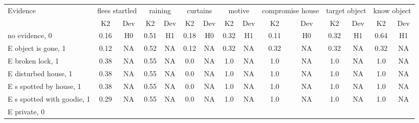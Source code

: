 \begin{table}\begin{tabular}{l|cc|cc|cc|cc|cc|cc|cc}\toprule\multirow{2}{*}{Evidence} & \multicolumn{2}{c}{flees startled}& \multicolumn{2}{c}{raining}& \multicolumn{2}{c}{curtains}& \multicolumn{2}{c}{motive}& \multicolumn{2}{c}{compromise house}& \multicolumn{2}{c}{target object}& \multicolumn{2}{c}{know object}\\& {K2} & {Dev}& {K2} & {Dev}& {K2} & {Dev}& {K2} & {Dev}& {K2} & {Dev}& {K2} & {Dev}& {K2} & {Dev}\\\midrule
no evidence, 0 & \cellcolor{Bittersweet}0.16&\cellcolor{Bittersweet}H0&\cellcolor{Bittersweet}0.51&\cellcolor{Bittersweet}H1&\cellcolor{Bittersweet}0.18&\cellcolor{Bittersweet}H0&\cellcolor{Bittersweet}0.32&\cellcolor{Bittersweet}H1&\cellcolor{Bittersweet}0.11&\cellcolor{Bittersweet}H0&\cellcolor{Bittersweet}0.32&\cellcolor{Bittersweet}H1&\cellcolor{Bittersweet}0.64&\cellcolor{Bittersweet}H1\\E object is gone, 1 & \cellcolor{Bittersweet}0.12&\cellcolor{Bittersweet}NA&\cellcolor{Bittersweet}0.52&\cellcolor{Bittersweet}NA&\cellcolor{Bittersweet}0.12&\cellcolor{Bittersweet}NA&\cellcolor{Bittersweet}0.32&\cellcolor{Bittersweet}NA&\cellcolor{Bittersweet}0.32&\cellcolor{Bittersweet}NA&\cellcolor{Bittersweet}0.32&\cellcolor{Bittersweet}NA&\cellcolor{Bittersweet}0.32&\cellcolor{Bittersweet}NA\\E broken lock, 1 & \cellcolor{Bittersweet}0.38&\cellcolor{Bittersweet}NA&\cellcolor{Bittersweet}0.55&\cellcolor{Bittersweet}NA&\cellcolor{Bittersweet}0.0&\cellcolor{Bittersweet}NA&\cellcolor{Bittersweet}1.0&\cellcolor{Bittersweet}NA&\cellcolor{Bittersweet}1.0&\cellcolor{Bittersweet}NA&\cellcolor{Bittersweet}1.0&\cellcolor{Bittersweet}NA&\cellcolor{Bittersweet}1.0&\cellcolor{Bittersweet}NA\\E disturbed house, 1 & \cellcolor{Bittersweet}0.38&\cellcolor{Bittersweet}NA&\cellcolor{Bittersweet}0.55&\cellcolor{Bittersweet}NA&\cellcolor{Bittersweet}0.0&\cellcolor{Bittersweet}NA&\cellcolor{Bittersweet}1.0&\cellcolor{Bittersweet}NA&\cellcolor{Bittersweet}1.0&\cellcolor{Bittersweet}NA&\cellcolor{Bittersweet}1.0&\cellcolor{Bittersweet}NA&\cellcolor{Bittersweet}1.0&\cellcolor{Bittersweet}NA\\E s spotted by house, 1 & \cellcolor{Bittersweet}0.38&\cellcolor{Bittersweet}NA&\cellcolor{Bittersweet}0.55&\cellcolor{Bittersweet}NA&\cellcolor{Bittersweet}0.0&\cellcolor{Bittersweet}NA&\cellcolor{Bittersweet}1.0&\cellcolor{Bittersweet}NA&\cellcolor{Bittersweet}1.0&\cellcolor{Bittersweet}NA&\cellcolor{Bittersweet}1.0&\cellcolor{Bittersweet}NA&\cellcolor{Bittersweet}1.0&\cellcolor{Bittersweet}NA\\E s spotted with goodie, 1 & \cellcolor{Bittersweet}0.29&\cellcolor{Bittersweet}NA&\cellcolor{Bittersweet}0.55&\cellcolor{Bittersweet}NA&\cellcolor{Bittersweet}0.0&\cellcolor{Bittersweet}NA&\cellcolor{Bittersweet}1.0&\cellcolor{Bittersweet}NA&\cellcolor{Bittersweet}1.0&\cellcolor{Bittersweet}NA&\cellcolor{Bittersweet}1.0&\cellcolor{Bittersweet}NA&\cellcolor{Bittersweet}1.0&\cellcolor{Bittersweet}NA\\E private, 0 & 
\end{tabular}
\end{table}
